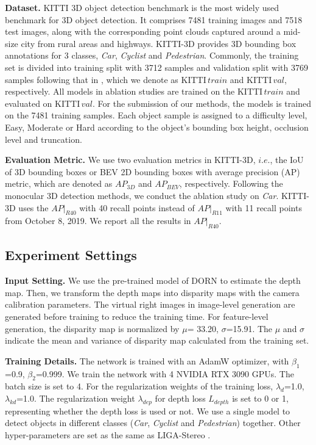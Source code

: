 \documentclass[10pt,twocolumn,letterpaper]{article}
\begin{document}
\noindent\textbf{Dataset.} KITTI 3D object detection benchmark \cite{KITTI} is the most widely used benchmark for 3D object detection. It comprises 7481 training images and 7518 test images, along with the corresponding point clouds captured around a mid-size city from rural areas and highways. 
KITTI-3D provides 3D bounding box annotations for 3 classes, \emph{Car}, \emph{Cyclist} and \emph{Pedestrian}.
Commonly, the training set is divided into training split with 3712 samples and validation split with 3769 samples following that in \cite{ding2019learning}, which we denote as KITTI\,$train$ and KITTI\,$val$, respectively. All models in ablation studies are trained on the KITTI\,$train$ and evaluated on KITTI\,$val$. For the submission of our methods, the models is trained on the 7481 training samples.
Each object sample is assigned to a difficulty level, Easy, Moderate or Hard according to the object's bounding box height, occlusion level and truncation. 


\noindent\textbf{Evaluation Metric.} We use two evaluation metrics in KITTI-3D, $i.e.$, the IoU of 3D bounding boxes or BEV 2D bounding boxes with average precision (AP) metric, which are denoted as $AP_{3D}$ and $ AP_{BEV}$, respectively. Following the monocular 3D detection methods\cite{ding2019learning, barabanau2019monocular, MonoFlex}, we conduct the ablation study on \emph{Car}. KITTI-3D uses the $AP|_{R40}$ with 40 recall points instead of $AP|_{R11}$ with 11 recall points from October 8, 2019. We report all the results in $AP|_{R40}$.
\subsection{Experiment Settings}
\noindent\textbf{Input Setting.} We use the pre-trained model of DORN \cite{DORN} to estimate the depth map. Then, we transform the depth maps into disparity maps with the camera calibration parameters. The virtual right images in image-level generation are generated before training to reduce the training time. For feature-level generation, the disparity map is normalized by $\mu$= 33.20, $\sigma$=15.91. The $\mu$ and $\sigma$ indicate the mean and variance of disparity map calculated from the training set.

\noindent\textbf{Training Details.} The network is trained with an AdamW \cite{loshchilov2017decoupled} optimizer, with $\beta _1$=0.9, $\beta _2$=0.999. We train the network with 4 NVIDIA RTX 3090 GPUs. The batch size is set to 4. For the regularization weights of the training loss, $\lambda_{d}$=1.0, $\lambda_{kd}$=1.0. The regularization weight $\lambda _{dep}$ for depth loss $L_{depth}$ is set to 0 or 1, representing whether the depth loss is used or not. We use a single model to detect objects in different classes (\emph{Car}, \emph{Cyclist} and \emph{Pedestrian}) together. Other hyper-parameters are set as the same as LIGA-Stereo \cite{guo2021liga}. 
\end{document}
